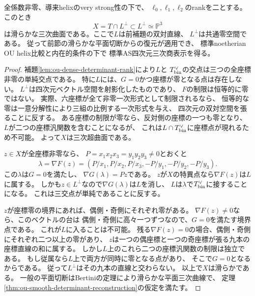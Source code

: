 \begin{theorem}[rank二の行列式切断は滑らかな三次曲面]
\label{thm:ou-dense-rank-two-smooth-surface}
全係数非零、導来helixのvery strong性の下で、
$\ell_0,\ell_1,\ell_2$のrankを二とする。
このとき
\[
 X=T\cap L^\perp\subset L^\perp\simeq\mathbb P^3
\]
は滑らかな三次曲面である。ここで$L$は前補題の双対直線、
$L^\perp$は共通零空間である。
従って前節の滑らかな平面切断からの復元が適用でき、
標準noetherian OU helix比較と内在的条件の下で
標準AS四次元三次商表示を得る。
\end{theorem}
\begin{proof}
補題\ref{lem:ou-dense-determinant-rank}により$L$と
$T^\vee_{\rm bin}$の交点は三つの全座標非零の単純交点である。
特に$L$には、$G=0$かつ座標が零となる点は存在しない。
$L^\perp$は四次元ベクトル空間を射影化したものであり、
$F$の制限は恒等的に零ではない。
実際、六座標が全て非零一次形式として制限されるなら、
恒等的な零は一意分解性により三組の比例する一次形式を与え、
四次元の双対空間を張ることに反する。
ある座標の制限が零なら、反対側の座標の一つも零となり、
$L$が二つの座標汎関数を含むことになるが、
これは$L\cap T^\vee_{\rm bin}$に座標点が現れるため不可能。
よって$X$は三次超曲面である。

$z\in X$が全座標非零なら、
$P=x_1x_2x_3=y_1y_2y_3\ne0$とおくと
\[
 \lambda=\nabla F(z)=
 (P/x_1,P/x_2,P/x_3,-P/y_1,-P/y_2,-P/y_3).
\]
この$\lambda$は$G=0$を満たし、
$\nabla G(\lambda)=Pz$である。
$z$が$X$の特異点なら$\nabla F(z)$は$L$に属する。
しかも$z\in L^\perp$なので$\nabla G(\lambda)$は$L$を消し、
$L$は$\lambda$で$T^\vee_{\rm bin}$に接することになる。
これは三交点が単純であることに反する。

$z$が座標零の境界にあれば、偶側・奇側にそれぞれ零がある。
$\nabla F(z)\ne0$なら、このベクトルの台は
偶側・奇側に高々一つずつなので、$G=0$を満たす境界点である。
これが$L$に入ることは不可能。
残る$\nabla F(z)=0$の場合、偶側・奇側にそれぞれ二つ以上の零があり、
$z$は一つの偶座標と一つの奇座標が張る九本の座標直線の和に属する。
しかし$L$上のこれら二つの座標汎関数の制限は独立である。
もし従属なら$L$上で両方が同時に零となる点があり、
そこで$G=0$となるからである。
従って$L^\perp$はその九本の直線と交わらない。
以上で$X$は滑らかである。
一般の平面切断はBertiniの定理により滑らかな平面三次曲線で、
定理\ref{thm:ou-smooth-determinant-reconstruction}の仮定を満たす。
\end{proof}

